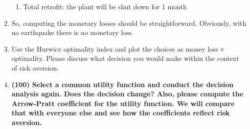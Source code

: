 \documentclass[11pt,a4paper]{article}
\begin{document}
\begin{enumerate}[leftmargin=*,topsep=0pt,font=\bfseries]
\begin{enumerate}
            \item Total retrofit: the plant will be shut down for 1 month
        \end{enumerate}
    \item[] So, computing the monetary losses should be straightforward. Obviously, with no earthquake there is no monetary loss.
    \item[] Use the Hurwicz optimality index and plot the choices as money loss v optimality. Please discuss what decision you would make within the context of risk aversion.
        \vspace{\baselineskip}






































\newpage
    \item\textbf{(100) Select a common utility function and conduct the decision analysis again. Does the decision change? Also, please compute the Arrow-Pratt coefficient for the utility function. We will compare that with everyone else and see how the coefficients reflect risk aversion.}
        \vspace{\baselineskip}










































\end{enumerate}
\end{document}
